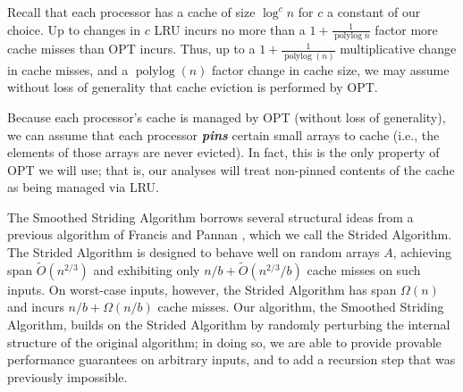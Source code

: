 \documentclass[sigplan, 10pt, nonacm]{acmart}
\newcommand{\polylog}{\operatorname{polylog}}
\newcommand{\defn}[1]{{\textit{\textbf{\boldmath #1}}}}
\renewcommand{\paragraph}[1]{\vspace{0.09in}\noindent{\bf \boldmath #1.}}
\theoremstyle{remark}
\theoremstyle{remark}
\begin{document}
Recall that each processor has a cache of size $\log^c n$ for $c$ a
constant of our choice.  Up to changes in $c$ LRU incurs no more than
a $1+\frac{1}{\operatorname{polylog}{n}}$ factor more cache misses
than OPT incurs. Thus, up to a $1 + \frac{1}{\polylog(n)}$
multiplicative change in cache misses, and a $\polylog(n)$ factor change in
cache size, we may assume without loss of generality that cache
eviction is performed by OPT.

Because each processor's cache is managed by OPT (without loss of
generality), we can assume that each processor \defn{pins} certain
small arrays to cache (i.e., the elements of those arrays are never
evicted). In fact, this is the only property of OPT we will use; that
is, our analyses will treat non-pinned contents of the cache as being
managed via LRU.

\paragraph{The Strided Algorithm \cite{FrancisPa92}}
The Smoothed Striding Algorithm borrows several structural ideas from a previous algorithm of Francis and Pannan \cite{FrancisPa92}, which we call the Strided Algorithm. The Strided Algorithm is designed to behave well on random arrays $A$, achieving span $\tilde{O}(n^{2/3})$ and exhibiting only $n/b + \tilde{O}(n^{2/3} / b)$  cache misses on such inputs. On worst-case inputs, however, the Strided Algorithm has span $\Omega(n)$ and incurs $n/b + \Omega(n/b)$ cache misses. Our algorithm, the Smoothed Striding Algorithm, builds on the Strided Algorithm by randomly perturbing the internal structure of the original algorithm; in doing so, we are able to provide provable performance guarantees on arbitrary inputs, and to add a recursion step that was previously impossible.
\end{document}
